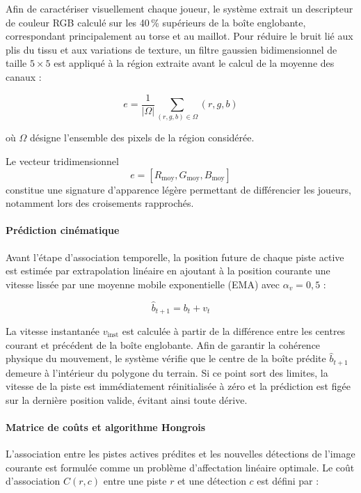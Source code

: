 Afin de caractériser visuellement chaque joueur, le système extrait un descripteur de couleur RGB calculé sur les 40\,\% supérieurs de la boîte englobante, correspondant principalement au torse et au maillot. Pour réduire le bruit lié aux plis du tissu et aux variations de texture, un filtre gaussien bidimensionnel de taille $5 \times 5$ est appliqué à la région extraite avant le calcul de la moyenne des canaux :

\[
e = \frac{1}{|\Omega|} \sum_{(r,g,b)\in\Omega}(r,g,b)
\tag{2.4}
\]

où $\Omega$ désigne l’ensemble des pixels de la région considérée.

Le vecteur tridimensionnel
\[
e = [R_{\text{moy}}, G_{\text{moy}}, B_{\text{moy}}]
\]
constitue une signature d’apparence légère permettant de différencier les joueurs, notamment lors des croisements rapprochés.

\paragraph{Prédiction cinématique}

Avant l’étape d’association temporelle, la position future de chaque piste active est estimée par extrapolation linéaire en ajoutant à la position courante une vitesse lissée par une moyenne mobile exponentielle (EMA) avec $\alpha_v = 0{,}5$ :

\[
\hat{b}_{t+1} = b_t + v_t
\tag{2.5}
\]

La vitesse instantanée $v_{\text{inst}}$ est calculée à partir de la différence entre les centres courant et précédent de la boîte englobante. Afin de garantir la cohérence physique du mouvement, le système vérifie que le centre de la boîte prédite $\hat{b}_{t+1}$ demeure à l’intérieur du polygone du terrain. Si ce point sort des limites, la vitesse de la piste est immédiatement réinitialisée à zéro et la prédiction est figée sur la dernière position valide, évitant ainsi toute dérive.

\paragraph{Matrice de coûts et algorithme Hongrois}

L’association entre les pistes actives prédites et les nouvelles détections de l’image courante est formulée comme un problème d’affectation linéaire optimale. Le coût d’association $C(r,c)$ entre une piste $r$ et une détection $c$ est défini par :

